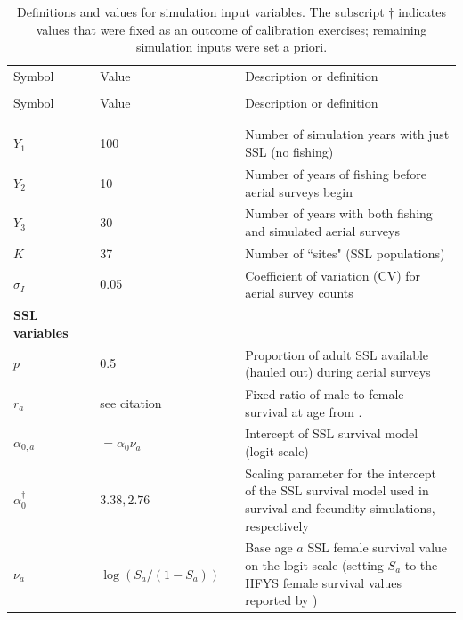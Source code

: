 \documentclass[11pt]{article}
\begin{document}
\begin{longtable}{p{2.5cm}lp{2.7cm}l p{8cm}}
\caption[Parameters]{\large Definitions and values for simulation input variables.  The subscript $\dag$
indicates values that were fixed as an outcome of calibration exercises; remaining simulation inputs were
set a priori.}
\label{tab:inputs} \\
\hline \hline
Symbol & & Value & & Description or definition \\
\cline{1-1} \cline{3-3} \cline{5-5} \\
\endfirsthead
\hline \hline
Symbol & & Value & & Description or definition \\
\cline{1-1} \cline{3-3} \cline{5-5} \\
\endhead
\hline
\endfoot
\hline
\endlastfoot
\multicolumn{1}{l}{\textbf{Survey variables}}  \\
$Y_1$ & & 100 & & Number of simulation years with just SSL (no fishing) \\
$Y_2$ & & 10 & & Number of years of fishing before aerial surveys begin \\
$Y_3$ & & 30 & & Number of years with both fishing and simulated aerial surveys \\
$K$ & & 37 & & Number of ``sites" (SSL populations)  \\
$\sigma_I$ & & 0.05 & & Coefficient of variation (CV) for aerial survey counts \\
\midrule
\multicolumn{1}{l}{\textbf{SSL variables}}  \\
$p$ & & 0.5 & & Proportion of adult SSL available (hauled out) during aerial surveys \\
$r_a$ & & see citation & & Fixed ratio
of male to female survival at age from \citet{CalkinsPitcher1982}. \\
$\alpha_{0,a}$ & & $=\alpha_0 \nu_a $ & & Intercept of SSL survival model (logit scale) \\
$\alpha_0^\dag$ & & $3.38,2.76$ & & Scaling parameter for the intercept of the SSL survival model used in
                                    survival and fecundity simulations, respectively\\
$\nu_a $ & & $\log(S_a/(1-S_a))$ & & Base age $a$ SSL female survival value on the logit scale (setting $S_a$ to the HFYS female survival values reported by \citet{HolmesEtAl2007})  \\

\end{longtable}
\end{document}
